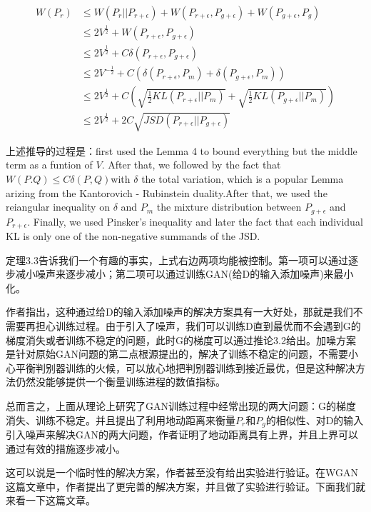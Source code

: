             \begin{Proof}
            \begin{align*}
            W(P_r) & \leqslant W(P_r||P_{r+\epsilon})+W(P_{r+\epsilon},P_{g+\epsilon})+W(P_{g+\epsilon},P_g)\\
             & \leqslant 2V^{\frac{1}{2}} + W(P_{r+\epsilon},P_{g+\epsilon})\\
             & \leqslant 2V^{\frac{1}{2}} + C\delta(P_{r+\epsilon},P_{g+\epsilon})\\
             & \leqslant 2V^{-\frac{1}{2}} + C(\delta(P_{r+\epsilon},P_m)+\delta(P_{g+\epsilon},P_m) )\\
             & \leqslant 2V^{\frac{1}{2}} + C \left( \sqrt{\frac{1}{2}KL(P_{r+\epsilon}||P_m)} + \sqrt{\frac{1}{2}KL(P_{g+\epsilon}||P_m)} \right) \\
             & \leqslant 2V^{\frac{1}{2}} + 2C\sqrt{JSD(P_{r+\epsilon}||P_{g+\epsilon})}
            \end{align*}
            \par
            上述推导的过程是：first used the Lemma 4 to bound everything but the middle term as a funtion of $V$. After that, we followed by the fact that $W(P.Q)\leqslant C\delta (P,Q)$with $\delta$ the total variation, which is a popular Lemma arizing from the Kantorovich - Rubinstein duality.After that, we used the reiangular inequality on $\delta$ and $P_m$ the mixture distribution between $P_{g+\epsilon}$ and $P_{r+\epsilon}$. Finally, we used Pinsker's inequality and later the fact that each individual KL is only one of the non-negative summands of the JSD.
            \end{Proof}
            \par
            定理3.3告诉我们一个有趣的事实，上式右边两项均能被控制。第一项可以通过逐步减小噪声来逐步减小；第二项可以通过训练GAN(给D的输入添加噪声)来最小化。
            \par
            作者指出，这种通过给D的输入添加噪声的解决方案具有一大好处，那就是我们不需要再担心训练过程。由于引入了噪声，我们可以训练D直到最优而不会遇到G的梯度消失或者训练不稳定的问题，此时G的梯度可以通过推论3.2给出。加噪方案是针对原始GAN问题的第二点根源提出的，解决了训练不稳定的问题，不需要小心平衡判别器训练的火候，可以放心地把判别器训练到接近最优，但是这种解决方法仍然没能够提供一个衡量训练进程的数值指标。
            \par
            总而言之，上面从理论上研究了GAN训练过程中经常出现的两大问题：G的梯度消失、训练不稳定。并且提出了利用地动距离来衡量$P_r$和$P_g$的相似性、对D的输入引入噪声来解决GAN的两大问题，作者证明了地动距离具有上界，并且上界可以通过有效的措施逐步减小。
            \par
            这可以说是一个临时性的解决方案，作者甚至没有给出实验进行验证。在WGAN\cite{2017.Chen}这篇文章中，作者提出了更完善的解决方案，并且做了实验进行验证。下面我们就来看一下这篇文章。

